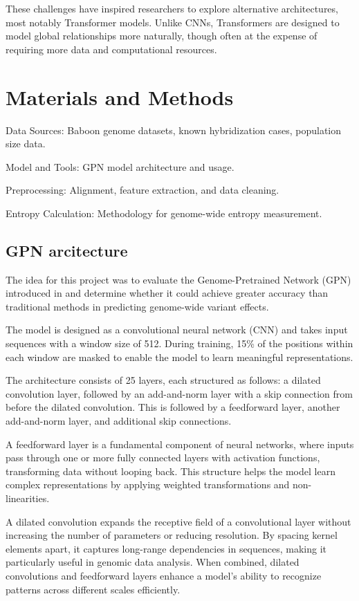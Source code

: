 \documentclass[
  a4paper,
  openany]{scrbook}
\begin{document}
These challenges have inspired researchers to explore alternative
architectures, most notably Transformer models. Unlike CNNs,
Transformers are designed to model global relationships more naturally,
though often at the expense of requiring more data and computational
resources.

\chapter{Materials and Methods}\label{materials-and-methods}

Data Sources: Baboon genome datasets, known hybridization cases,
population size data.

Model and Tools: GPN model architecture and usage.

Preprocessing: Alignment, feature extraction, and data cleaning.

Entropy Calculation: Methodology for genome-wide entropy measurement.

\section{GPN arcitecture}\label{gpn-arcitecture}

The idea for this project was to evaluate the Genome-Pretrained Network
(GPN) introduced in \cite{Kantorovitz2024} and determine whether it
could achieve greater accuracy than traditional methods in predicting
genome-wide variant effects.

The model is designed as a convolutional neural network (CNN) and takes
input sequences with a window size of 512. During training, 15\% of the
positions within each window are masked to enable the model to learn
meaningful representations.

The architecture consists of 25 layers, each structured as follows: a
dilated convolution layer, followed by an add-and-norm layer with a skip
connection from before the dilated convolution. This is followed by a
feedforward layer, another add-and-norm layer, and additional skip
connections.

A feedforward layer is a fundamental component of neural networks, where
inputs pass through one or more fully connected layers with activation
functions, transforming data without looping back. This structure helps
the model learn complex representations by applying weighted
transformations and non-linearities.

A dilated convolution expands the receptive field of a convolutional
layer without increasing the number of parameters or reducing
resolution. By spacing kernel elements apart, it captures long-range
dependencies in sequences, making it particularly useful in genomic data
analysis. When combined, dilated convolutions and feedforward layers
enhance a model's ability to recognize patterns across different scales
efficiently.
\end{document}
